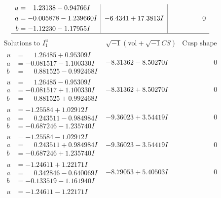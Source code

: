 \documentclass[1p]{elsarticle_modified}
\theoremstyle{definition}
\newcommand{\I}{\sqrt{-1}}
\begin{document}
$$\begin{array}{c|c|c}
\begin{aligned}
u &= \phantom{-}1.23138 - 0.94766 I \\
a &= -0.005878 - 1.239660 I \\
b &= -1.12230 - 1.17955 I\end{aligned}
 & -6.4341 + 17.3813 I & \phantom{-0.000000 } 0\\
 \hline 
 \end{array}$$\newpage$$\begin{array}{c|c|c}  
\text{Solutions to }I^u_{1}& \I (\text{vol} + \sqrt{-1}CS) & \text{Cusp shape}\\
 \hline 
\begin{aligned}
u &= \phantom{-}1.26485 + 0.95309 I \\
a &= -0.081517 - 1.100330 I \\
b &= \phantom{-}0.881525 - 0.992468 I\end{aligned}
 & -8.31362 - 8.50270 I & \phantom{-0.000000 } 0 \\ \hline\begin{aligned}
u &= \phantom{-}1.26485 - 0.95309 I \\
a &= -0.081517 + 1.100330 I \\
b &= \phantom{-}0.881525 + 0.992468 I\end{aligned}
 & -8.31362 + 8.50270 I & \phantom{-0.000000 } 0 \\ \hline\begin{aligned}
u &= -1.25584 + 1.02912 I \\
a &= \phantom{-}0.243511 - 0.984984 I \\
b &= -0.687246 - 1.235740 I\end{aligned}
 & -9.36023 + 3.54419 I & \phantom{-0.000000 } 0 \\ \hline\begin{aligned}
u &= -1.25584 - 1.02912 I \\
a &= \phantom{-}0.243511 + 0.984984 I \\
b &= -0.687246 + 1.235740 I\end{aligned}
 & -9.36023 - 3.54419 I & \phantom{-0.000000 } 0 \\ \hline\begin{aligned}
u &= -1.24611 + 1.22171 I \\
a &= \phantom{-}0.342846 - 0.640069 I \\
b &= -0.133519 - 1.161940 I\end{aligned}
 & -8.79053 + 5.40503 I & \phantom{-0.000000 } 0 \\ \hline\begin{aligned}
u &= -1.24611 - 1.22171 I \\

\end{aligned}
\end{array}$$
\end{document}
